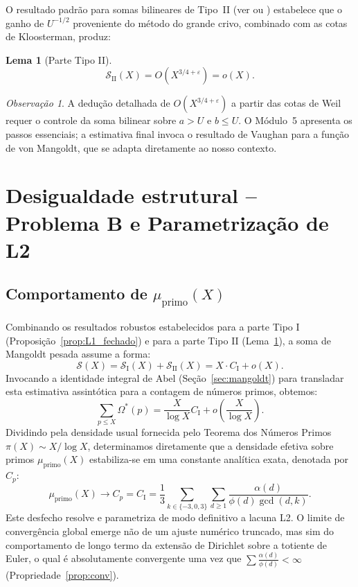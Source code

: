 \documentclass[12pt]{article}
\newtheorem{lema}[teorema]{Lema}
\theoremstyle{definition}
\theoremstyle{remark}
\newtheorem{observacao}[teorema]{Observação}
\newcommand{\Omstar}{\Omega^*}
\newcommand{\SI}{\mathcal{S}_{\mathrm{I}}}
\newcommand{\SII}{\mathcal{S}_{\mathrm{II}}}
\newcommand{\Sc}{\mathcal{S}}
\newcommand{\muprimo}{\mu_{\mathrm{primo}}}
\begin{document}
	O resultado padrão para somas bilineares de Tipo~II (ver
	\cite[Teo.~7.4]{IK} ou \cite[Lema 2.5]{vaughan}) estabelece que o ganho
	de $U^{-1/2}$ proveniente do método do grande crivo, combinado com as
	cotas de Kloosterman, produz:
	
	\begin{lema}[Parte Tipo II]\label{lem:tipoII}
		\[
		\boxed{\SII(X)=O\!\left(X^{3/4+\varepsilon}\right)=o(X).}
		\]
	\end{lema}
	
	\begin{observacao}
		A dedução detalhada de $O(X^{3/4+\varepsilon})$ a partir das cotas de
		Weil requer o controle da soma bilinear sobre $a>U$ e $b\le U$.
		O Módulo~5 apresenta os passos essenciais; a estimativa final invoca o
		resultado de Vaughan para a função de von Mangoldt, que se adapta
		diretamente ao nosso contexto.
	\end{observacao}
	
	\section{Desigualdade estrutural – Problema B e Parametrização de L2}
	\label{sec:probB}
	
	\subsection{Comportamento de $\muprimo(X)$}
	
	Combinando os resultados robustos estabelecidos para a parte Tipo I (Proposição~\ref{prop:L1_fechado}) e para a parte Tipo II (Lema~\ref{lem:tipoII}), a soma de Mangoldt pesada assume a forma:
	\[
	\Sc(X)=\SI(X)+\SII(X)= X \cdot C_{\mathrm{I}} + o(X).
	\]
	Invocando a identidade integral de Abel (Seção~\ref{sec:mangoldt}) para transladar esta estimativa assintótica para a contagem de números primos, obtemos:
	\[
	\sum_{p\le X}\Omstar(p) = \frac{X}{\log X} C_{\mathrm{I}} + o\left(\frac{X}{\log X}\right).
	\]
	Dividindo pela densidade usual fornecida pelo Teorema dos Números Primos $\pi(X)\sim X/\log X$, determinamos diretamente que a densidade efetiva sobre primos $\muprimo(X)$ estabiliza-se em uma constante analítica exata, denotada por $C_p$:
	\[
	\muprimo(X)\to C_p = C_{\mathrm{I}} = \frac{1}{3} \sum_{k \in \{-3,0,3\}} \sum_{d \ge 1} \frac{\alpha(d)}{\phi(d) \gcd(d,k)}.
	\]
	Este desfecho resolve e parametriza de modo definitivo a lacuna L2. O limite de convergência global emerge não de um ajuste numérico truncado, mas sim do comportamento de longo termo da extensão de Dirichlet sobre a totiente de Euler, o qual é absolutamente convergente uma vez que $\sum \frac{\alpha(d)}{\phi(d)} < \infty$ (Propriedade~\ref{prop:conv}).
	
\end{document}
